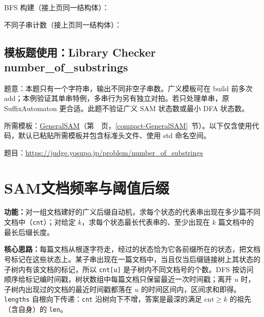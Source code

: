 

\newpage

\noindent BFS 构建（接上页同一结构体）：



\newpage

\noindent 不同子串计数（接上页同一结构体）：



\Needspace{300pt}

\subsection*{模板题使用：Library Checker number\_of\_substrings}

\label{usage-example-90}

题意：本题只有一个字符串，输出不同非空子串数。广义模板可在 build 前多次 add；本例验证其单串特例，多串行为另有独立对拍。若只处理单串，原 SuffixAutomaton 更合适。此题不验证广义 SAM 状态数或最小 DFA 状态数。

所需模板：\hyperref[compact-GeneralSAM]{GeneralSAM}（第~\pageref{compact-GeneralSAM}~页，\ref{compact-GeneralSAM}~节）。以下仅含使用代码，默认已粘贴所需模板并包含标准头文件、使用 std 命名空间。

题目：\url{https://judge.yosupo.jp/problem/number_of_substrings}



\section{SAM文档频率与阈值后缀}\label{compact-SAMDocuments}

\noindent\textbf{功能：}\allowbreak 对一组文档建好的广义后缀自动机，求每个状态的代表串出现在多少篇不同文档中（\texttt{cnt}）；对给定 $k$，求每个状态最长代表串的、至少出现在 $k$ 篇文档中的最长后缀长度。

\textbf{核心思路：}\allowbreak 每篇文档从根逐字符走，经过的状态恰为它各前缀所在的状态，把文档号标记在这些状态上。某子串出现在一篇文档中，当且仅当后缀链接树上其状态的子树内有该文档的标记，所以 \texttt{cnt[u]} 是子树内不同文档号的个数。DFS 按访问顺序给标记编时间戳，树状数组中每篇文档只保留最近一次时间戳；离开 $u$ 时，子树内出现过的文档的最近时间戳都落在 $u$ 的时间区间内，区间求和即得。\texttt{lengths} 自根向下传递：\texttt{cnt} 沿树向下不增，答案是最深的满足 $\mathrm{cnt}\ge k$ 的祖先（含自身）的 \texttt{len}。

